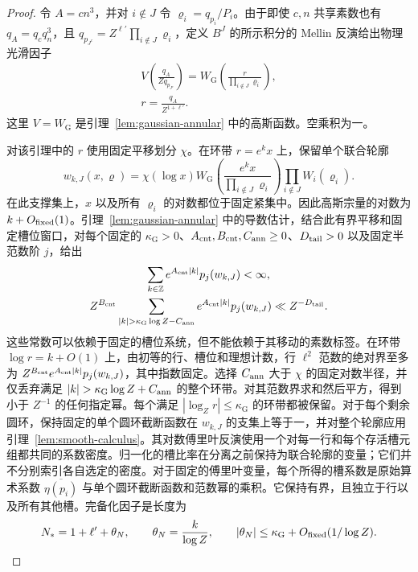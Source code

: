 \documentclass[11pt,a4paper]{article}
\numberwithin{equation}{section}
\numberwithin{figure}{section}
\theoremstyle{definition}
\theoremstyle{remark}
\begin{document}
\begin{proof}
令 $A=cn^3$，并对 $i\notin J$ 令 $\varrho_i=q_{p_i}/P_i$。由于即使 $c,n$ 共享素数也有 $q_A=q_cq_n^3$，且 $q_{p_{J^c}}=Z^{\ell'}\prod_{i\notin J}\varrho_i$，定义 $B^J$ 的所示积分的 Mellin 反演给出物理光滑因子
\[
 \begin{gathered}
 V\!\left(\frac{q_A}{Zq_{p_{J^c}}}\right)
 =W_{\mathrm G}\!\left(\frac{r}{\prod_{i\notin J}\varrho_i}\right),\\
 r=\frac{q_A}{Z^{1+\ell'}}.
 \end{gathered}
\]
这里 $V=W_{\mathrm G}$ 是引理~\ref{lem:gaussian-annular} 中的高斯函数。空乘积为一。

对该引理中的 $r$ 使用固定平移划分 $\chi$。在环带 $r=e^kx$ 上，保留单个联合轮廓
\[
 w_{k,J}(x,\boldsymbol\varrho)
 =\chi(\log x)W_{\mathrm G}\!\left(
       \frac{e^kx}{\prod_{i\notin J}\varrho_i}\right)
       \prod_{i\notin J}W_i(\varrho_i).
\]
在此支撑集上，$x$ 以及所有 $\varrho_i$ 的对数都位于固定紧集中。因此高斯宗量的对数为 $k+O_{\rm fixed}(1)$。引理~\ref{lem:gaussian-annular} 中的导数估计，结合此有界平移和固定槽位窗口，对每个固定的 $\kappa_{\mathrm G}>0$、$A_{\rm cnt},B_{\rm cnt},C_{\rm ann}\ge0$、$D_{\rm tail}>0$ 以及固定半范数阶 $j$，给出
\[
 \begin{gathered}
 \sum_{k\in\mathbb Z}e^{A_{\rm cnt}|k|}p_j(w_{k,J})<\infty,
 \\
 Z^{B_{\rm cnt}}
 \sum_{|k|>\kappa_{\mathrm G}\log Z-C_{\rm ann}}
       e^{A_{\rm cnt}|k|}p_j(w_{k,J})
       \ll Z^{-D_{\rm tail}}.
 \end{gathered}
\]
这些常数可以依赖于固定的槽位系统，但不能依赖于其移动的素数标签。在环带 $\log r=k+O(1)$ 上，由初等的行、槽位和理想计数，行 $\ell^2$ 范数的绝对界至多为 $Z^{B_{\rm cnt}}e^{A_{\rm cnt}|k|}p_j(w_{k,J})$，其中指数固定。选择 $C_{\rm ann}$ 大于 $\chi$ 的固定对数半径，并仅丢弃满足 $|k|>\kappa_{\mathrm G}\log Z+C_{\rm ann}$ 的整个环带。对其范数界求和然后平方，得到小于 $Z^{-1}$ 的任何指定幂。每个满足 $|\log_Z r|\le\kappa_{\mathrm G}$ 的环带都被保留。对于每个剩余圆环，保持固定的单个圆环截断函数在 $w_{k,J}$ 的支集上等于一，并对整个轮廓应用引理~\ref{lem:smooth-calculus}。其对数傅里叶反演使用一个对每一行和每个存活槽元组都共同的系数密度。归一化的槽比率在分离之前保持为联合轮廓的变量；它们并不分别索引各自选定的密度。对于固定的傅里叶变量，每个所得的槽系数是原始算术系数 $\overline{\eta(p_i)}$ 与单个圆环截断函数和范数幂的乘积。它保持有界，且独立于行以及所有其他槽。完备化因子是长度为
\[
 N_*=1+\ell'+\theta_N,\qquad
 \theta_N=\frac{k}{\log Z},\qquad
 |\theta_N|\le\kappa_{\mathrm G}+O_{\rm fixed}(1/\log Z).
\]

\end{proof}
\end{document}
